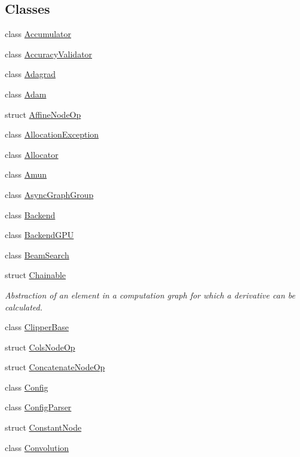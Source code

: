 \subsection*{Classes}
\begin{DoxyCompactItemize}
\item 
class \hyperlink{classmarian_1_1Accumulator}{Accumulator}
\item 
class \hyperlink{classmarian_1_1AccuracyValidator}{Accuracy\+Validator}
\item 
class \hyperlink{classmarian_1_1Adagrad}{Adagrad}
\item 
class \hyperlink{classmarian_1_1Adam}{Adam}
\item 
struct \hyperlink{structmarian_1_1AffineNodeOp}{Affine\+Node\+Op}
\item 
class \hyperlink{classmarian_1_1AllocationException}{Allocation\+Exception}
\item 
class \hyperlink{classmarian_1_1Allocator}{Allocator}
\item 
class \hyperlink{classmarian_1_1Amun}{Amun}
\item 
class \hyperlink{classmarian_1_1AsyncGraphGroup}{Async\+Graph\+Group}
\item 
class \hyperlink{classmarian_1_1Backend}{Backend}
\item 
class \hyperlink{classmarian_1_1BackendGPU}{Backend\+G\+PU}
\item 
class \hyperlink{classmarian_1_1BeamSearch}{Beam\+Search}
\item 
struct \hyperlink{classmarian_1_1Chainable}{Chainable}
\begin{DoxyCompactList}\small\item\em Abstraction of an element in a computation graph for which a derivative can be calculated. \end{DoxyCompactList}\item 
class \hyperlink{classmarian_1_1ClipperBase}{Clipper\+Base}
\item 
struct \hyperlink{structmarian_1_1ColsNodeOp}{Cols\+Node\+Op}
\item 
struct \hyperlink{structmarian_1_1ConcatenateNodeOp}{Concatenate\+Node\+Op}
\item 
class \hyperlink{classmarian_1_1Config}{Config}
\item 
class \hyperlink{classmarian_1_1ConfigParser}{Config\+Parser}
\item 
struct \hyperlink{structmarian_1_1ConstantNode}{Constant\+Node}
\item 
class \hyperlink{classmarian_1_1Convolution}{Convolution}

\end{DoxyCompactItemize}
